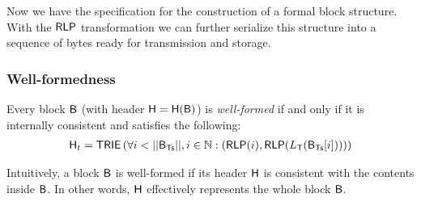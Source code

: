 Now we have the specification for the construction of a formal block structure. 
With the $\mathsf{RLP}$ transformation we can further serialize this structure into a sequence of bytes ready for transmission and storage. 
 

  
\subsubsection{Well-formedness}
\label{sec:internal consistency}
Every {\name} block $\textsf{B}$ (with header $\textsf{H}=\textsf{H}(\textsf{B})$) is \emph{well-formed} if and only if it is internally consistent and satisfies the following: 
\begin{align}
	\head_t = \trie\left(\forall i<||\block_{\txs}||, i\in \N: \left(\rlp(i),\rlp(L_{\tx}(\block_{\txs}[i]))\right) \right)  
\end{align}

Intuitively, a block $\textsf{B}$ is well-formed if its header $\textsf{H}$ is consistent with the contents inside $\textsf{B}$.
In other words, $\textsf{H}$ effectively represents the whole block $\textsf{B}$.






